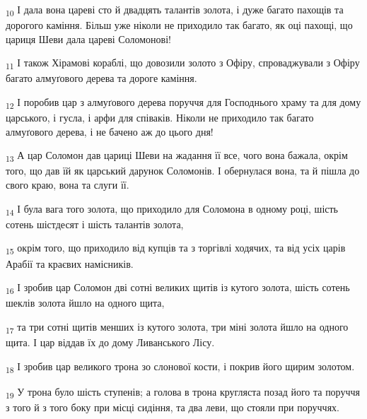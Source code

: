 \begin{tcolorbox}
\textsubscript{10} І дала вона цареві сто й двадцять талантів золота, і дуже багато пахощів та дорогого каміння. Більш уже ніколи не приходило так багато, як оці пахощі, що цариця Шеви дала цареві Соломонові!
\end{tcolorbox}
\begin{tcolorbox}
\textsubscript{11} І також Хірамові кораблі, що довозили золото з Офіру, спроваджували з Офіру багато алмуґового дерева та дороге каміння.
\end{tcolorbox}
\begin{tcolorbox}
\textsubscript{12} І поробив цар з алмуґового дерева поруччя для Господнього храму та для дому царського, і гусла, і арфи для співаків. Ніколи не приходило так багато алмуґового дерева, і не бачено аж до цього дня!
\end{tcolorbox}
\begin{tcolorbox}
\textsubscript{13} А цар Соломон дав цариці Шеви на жадання її все, чого вона бажала, окрім того, що дав їй як царський дарунок Соломонів. І обернулася вона, та й пішла до свого краю, вона та слуги її.
\end{tcolorbox}
\begin{tcolorbox}
\textsubscript{14} І була вага того золота, що приходило для Соломона в одному році, шість сотень шістдесят і шість талантів золота,
\end{tcolorbox}
\begin{tcolorbox}
\textsubscript{15} окрім того, що приходило від купців та з торгівлі ходячих, та від усіх царів Арабії та краєвих намісників.
\end{tcolorbox}
\begin{tcolorbox}
\textsubscript{16} І зробив цар Соломон дві сотні великих щитів із кутого золота, шість сотень шеклів золота йшло на одного щита,
\end{tcolorbox}
\begin{tcolorbox}
\textsubscript{17} та три сотні щитів менших із кутого золота, три міні золота йшло на одного щита. І цар віддав їх до дому Ливанського Лісу.
\end{tcolorbox}
\begin{tcolorbox}
\textsubscript{18} І зробив цар великого трона зо слонової кости, і покрив його щирим золотом.
\end{tcolorbox}
\begin{tcolorbox}
\textsubscript{19} У трона було шість ступенів; а голова в трона кругляста позад його та поруччя з того й з того боку при місці сидіння, та два леви, що стояли при поруччях.
\end{tcolorbox}
